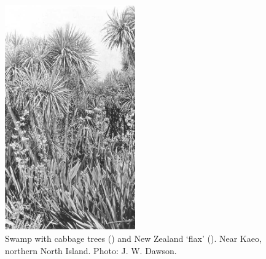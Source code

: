 \begin{figure}
	\includegraphics[width=0.5\textwidth]{graphics/figure66cabbagetree.jpg}
	\centering
	\caption[Swamp with cabbage trees]{Swamp with cabbage trees () and New Zealand `flax' (). Near Kaeo, northern North Island.
	Photo: J. W. Dawson.}%
	\label{fig:66cabbagetree}
\end{figure}

